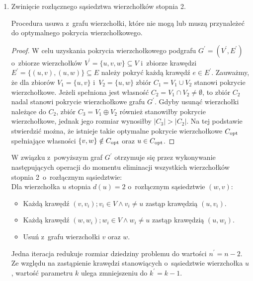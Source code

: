 \begin{enumerate}
  \item Zwinięcie rozłącznego sąsiedztwa wierzchołków stopnia 2.
    \begin{theorem}
      Procedura usuwa z~grafu wierzchołki, które nie mogą lub muszą przynależeć do 
      optymalnego pokrycia wierzchołkowego.
    \end{theorem}
    \begin{proof}
      W celu uzyskania pokrycia wierzchołkowego podgrafu $G^\prime=(V^\prime,E^\prime)$ o~zbiorze wierzchołków $V^\prime=\{u, v, w\} \subseteq V$ i~zbiorze krawędzi $E^\prime=\{(u,v), (u,w)\} \subseteq E$ należy pokryć każdą krawędź $e \in E^\prime$. 
      Zauważmy, że dla zbiorów $V_1=\{u,v\}$ i~$V_2=\{u,w\}$ zbiór $C_1=V_1 \cup V_2$ stanowi pokrycie wierzchołkowe.
      Jeżeli spełniona jest własność $C_2=V_1 \cap V_2 \neq \emptyset$, to zbiór $C_2$ nadal stanowi pokrycie wierzchołkowe grafu $G^\prime$.
      Gdyby usunąć wierzchołki należące do $C_2$, zbiór $C_3=V_1 \oplus V_2$ również stanowiłby pokrycie wierzchołkowe, jednak jego rozmiar wynosiłby $|C_3| > |C_2|$.
      Na tej podstawie stwierdzić można, że istnieje takie optymalne pokrycie wierzchołkowe $C_{\textnormal{opt}}$ spełniające własności $\{v,w\} \notin C_{\textnormal{opt}}$ oraz $u \in C_{\textnormal{opt}}$.
    \end{proof}

    W związku z~powyższym graf $G^\prime$ otrzymuje się przez wykonywanie następujących operacji do momentu eliminacji wszystkich wierzchołków stopnia 2\ o~rozłącznym 
    sąsiedztwie:\\
    Dla wierzchołka $u$ stopnia $d(u)=2$ o~rozłącznym sąsiedztwie $(w,v)$:
    \begin{itemize}
      \item Każdą krawędź $(v,v_i); v_i \in V \land v_i \neq u$ zastąp 
        krawędzią $(u, v_i)$.
      \item Każdą krawędź $(w,w_i); w_i \in V \land w_i \neq u$ zastąp
        krawędzią $(u, w_i)$.
      \item Usuń z~grafu wierzchołki $v$ oraz $w$.
    \end{itemize}
    Jedna iteracja redukuje rozmiar dziedziny problemu do wartości
    $n^\prime=n-2$.
    Ze względu na zastąpienie krawędzi stanowiących o~sąsiedztwie wierzchołka $u$, wartość parametru $k$ ulega zmniejszeniu do $k^\prime=k-1$.
\end{enumerate}